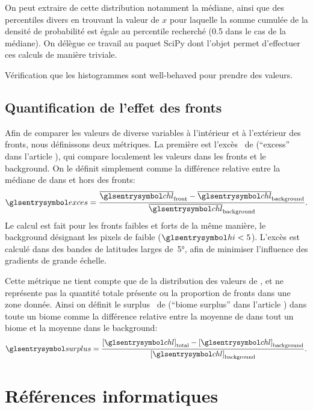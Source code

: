 On peut extraire de cette distribution notamment la médiane, ainsi que des percentiles divers en trouvant la valeur de \(x\) pour laquelle la somme cumulée de la densité de probabilité est égale au percentile recherché (0.5 dans le cas de la médiane).
On délègue ce travail au paquet SciPy dont l'objet  permet d'effectuer ces calculs de manière triviale.

Vérification que les histogrammes sont well-behaved pour prendre des valeurs.

\subsection{Quantification de l'effet des fronts}
\label{sec:extraction-surplus}

Afin de comparer les valeurs de diverse variables à l'intérieur et à l'extérieur des fronts, nous définissons deux métriques.
La première est l'excès~ de  (\enquote{excess} dans l'article ), qui compare localement les valeurs dans les fronts et le background. On le définit simplement comme la différence relative entre la médiane de  dans et hors des fronts:
\begin{equation}
  \am{exces} = \frac{\med{\am{chl}}_\frt - \med{\am{chl}}_\bkg}
  {\med{\am{chl}}_\bkg} .
\end{equation}
Le calcul est fait pour les fronts faibles et forts de la même manière, le background désignant les pixels de  faible (\(\am{hi} < 5\)).
L'excès est calculé dans des bandes de latitudes larges de~\ang{5}, afin de minimiser l'influence des gradients de grande échelle.

Cette métrique ne tient compte que de la distribution des valeurs de , et ne représente pas la quantité totale présente ou la proportion de fronts dans une zone donnée.
Ainsi on définit le surplus~ de  (\enquote{biome surplus} dans l'article ) dans toute un biome comme la différence relative entre la moyenne de  dans tout un biome et la moyenne dans le background:
\begin{equation}
  \am{surplus} = \frac{\moy{\am{chl}}_\tot - \moy{\am{chl}}_\bkg}
  {\moy{\am{chl}}_\bkg} .
\end{equation}

\section{Références informatiques}
\label{sec:ref-info}

